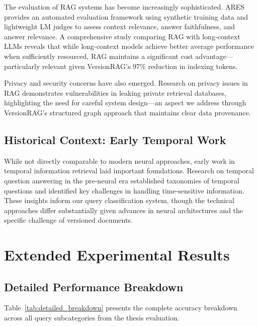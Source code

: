 The evaluation of RAG systems has become increasingly sophisticated. ARES \cite{saadf2024ares} provides an automated evaluation framework using synthetic training data and lightweight LM judges to assess context relevance, answer faithfulness, and answer relevance. A comprehensive study \cite{li2024raglongcontext} comparing RAG with long-context LLMs reveals that while long-context models achieve better average performance when sufficiently resourced, RAG maintains a significant cost advantage—particularly relevant given VersionRAG's 97\% reduction in indexing tokens.

Privacy and security concerns have also emerged. Research on privacy issues in RAG \cite{zeng2024privacy} demonstrates vulnerabilities in leaking private retrieval databases, highlighting the need for careful system design—an aspect we address through VersionRAG's structured graph approach that maintains clear data provenance.

\subsection{Historical Context: Early Temporal Work}

While not directly comparable to modern neural approaches, early work in temporal information retrieval laid important foundations. Research on temporal question answering in the pre-neural era established taxonomies of temporal questions and identified key challenges in handling time-sensitive information. These insights inform our query classification system, though the technical approaches differ substantially given advances in neural architectures and the specific challenge of versioned documents.


\section{Extended Experimental Results}

\subsection{Detailed Performance Breakdown}

Table~\ref{tab:detailed_breakdown} presents the complete accuracy breakdown across all query subcategories from the thesis evaluation.

